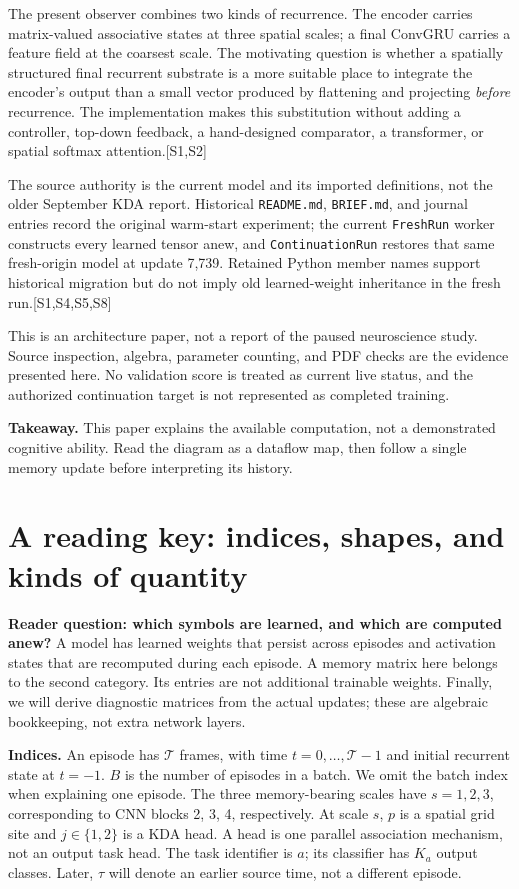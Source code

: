 \documentclass[10pt,letterpaper]{article}
\newcommand{\src}[1]{\textcolor{accent}{\textsf{[#1]}}}
\newcommand{\takeaway}[1]{\par\smallskip\noindent\textbf{Takeaway.} #1}
\newcommand{\psection}[1]{\clearpage\section{#1}}
\begin{document}
The present observer combines two kinds of recurrence. The encoder carries matrix-valued associative states at three spatial scales; a final ConvGRU carries a feature field at the coarsest scale. The motivating question is whether a spatially structured final recurrent substrate is a more suitable place to integrate the encoder's output than a small vector produced by flattening and projecting \emph{before} recurrence. The implementation makes this substitution without adding a controller, top-down feedback, a hand-designed comparator, a transformer, or spatial softmax attention.\src{S1,S2}

The source authority is the current model and its imported definitions, not the older September KDA report. Historical \texttt{README.md}, \texttt{BRIEF.md}, and journal entries record the original warm-start experiment; the current \texttt{FreshRun} worker constructs every learned tensor anew, and \texttt{ContinuationRun} restores that same fresh-origin model at update 7,739. Retained Python member names support historical migration but do not imply old learned-weight inheritance in the fresh run.\src{S1,S4,S5,S8}

This is an architecture paper, not a report of the paused neuroscience study. Source inspection, algebra, parameter counting, and PDF checks are the evidence presented here. No validation score is treated as current live status, and the authorized continuation target is not represented as completed training.

\takeaway{This paper explains the available computation, not a demonstrated cognitive ability. Read the diagram as a dataflow map, then follow a single memory update before interpreting its history.}

\psection{A reading key: indices, shapes, and kinds of quantity}
\textbf{Reader question: which symbols are learned, and which are computed anew?}
A model has learned weights that persist across episodes and activation states that are recomputed during each episode. A memory matrix here belongs to the second category. Its entries are not additional trainable weights. Finally, we will derive diagnostic matrices from the actual updates; these are algebraic bookkeeping, not extra network layers.

\textbf{Indices.} An episode has $\mathcal T$ frames, with time $t=0,\ldots,\mathcal T-1$ and initial recurrent state at $t=-1$. $B$ is the number of episodes in a batch. We omit the batch index when explaining one episode. The three memory-bearing scales have $s=1,2,3$, corresponding to CNN blocks 2, 3, 4, respectively. At scale $s$, $p$ is a spatial grid site and $j\in\{1,2\}$ is a KDA head. A head is one parallel association mechanism, not an output task head. The task identifier is $a$; its classifier has $K_a$ output classes. Later, $\tau$ will denote an earlier source time, not a different episode.
\end{document}
